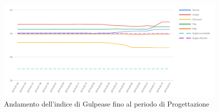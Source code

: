 \begin{figure}[H]
	\includegraphics[width=1\linewidth]{sez/App_Esito/Progettazione/graph/PR_Storico_Gulp2.pdf}
	\caption{Andamento dell'indice di Gulpease fino al periodo di Progettazione}
\end{figure}

